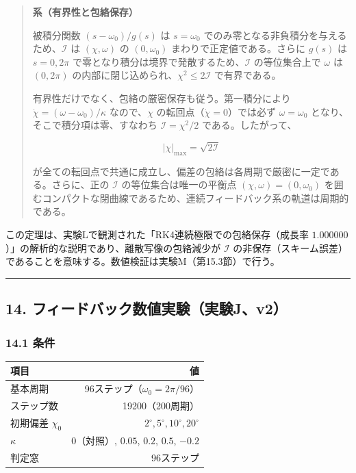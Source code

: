 \documentclass[
  a4paper,
]{ltjsarticle}
\newcounter{none} %
\begin{document}
\begin{quote}
\textbf{系（有界性と包絡保存）}

被積分関数 \((s-\omega_0)/g(s)\) は \(s=\omega_0\)
でのみ零となる非負積分を与えるため、\(\mathcal I\) は \((\chi,\omega)\)
の \((0,\omega_0)\) まわりで正定値である。さらに \(g(s)\) は
\(s=0,2\pi\) で零となり積分は境界で発散するため、\(\mathcal I\)
の等位集合上で \(\omega\) は \((0,2\pi)\)
の内部に閉じ込められ、\(\chi^2\le2\mathcal I\) で有界である。

有界性だけでなく、包絡の厳密保存も従う。第一積分により
\(\dot\chi=(\omega-\omega_0)/\kappa\) なので、\(\chi\)
の転回点（\(\dot\chi=0\)）では必ず \(\omega=\omega_0\)
となり、そこで積分項は零、すなわち \(\mathcal I=\chi^2/2\)
である。したがって、

\[
\boxed{
\lvert\chi\rvert_{\max}=\sqrt{2\mathcal I}
}
\]

が全ての転回点で共通に成立し、偏差の包絡は各周期で厳密に一定である。さらに、正の
\(\mathcal I\) の等位集合は唯一の平衡点 \((\chi,\omega)=(0,\omega_0)\)
を囲むコンパクトな閉曲線であるため、連続フィードバック系の軌道は周期的である。
\end{quote}

この定理は、実験Lで観測された「RK4連続極限での包絡保存（成長率
\(1.000000\)）」の解析的な説明であり、離散写像の包絡減少が
\(\mathcal I\)
の非保存（スキーム誤差）であることを意味する。数値検証は実験M（第15.3節）で行う。

\begin{center}\rule{0.5\linewidth}{0.5pt}\end{center}

\subsection{14.
フィードバック数値実験（実験J、v2）}\label{ux30d5ux30a3ux30fcux30c9ux30d0ux30c3ux30afux6570ux5024ux5b9fux9a13ux5b9fux9a13jv2}

\subsubsection{14.1 条件}\label{ux6761ux4ef6}

{\def\LTcaptype{none} %
\begin{longtable}[]{@{}lr@{}}
\toprule\noalign{}
項目 & 値 \\
\midrule\noalign{}
\endhead
\bottomrule\noalign{}
\endlastfoot
基本周期 & 96ステップ（\(\omega_0=2\pi/96\)） \\
ステップ数 & 19200（200周期） \\
初期偏差 \(\chi_0\) & \(2^\circ,5^\circ,10^\circ,20^\circ\) \\
\(\kappa\) & \(0\)（対照）, \(0.05\), \(0.2\), \(0.5\), \(-0.2\) \\
判定窓 & 96ステップ \\
\end{longtable}
}
\end{document}
